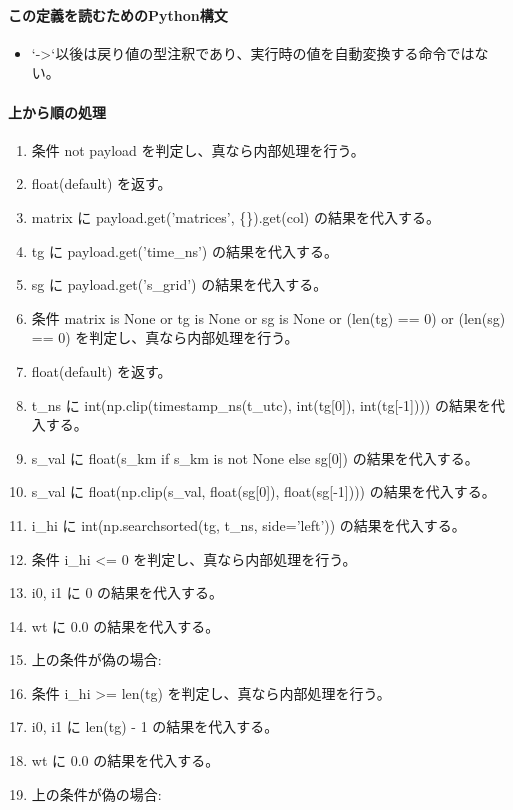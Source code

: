 \documentclass[a4paper,11pt]{article}
\begin{document}
            \paragraph{この定義を読むためのPython構文}
            \begin{itemize}[leftmargin=1.6em]
            \item `->`以後は戻り値の型注釈であり、実行時の値を自動変換する命令ではない。
            \end{itemize}
            \paragraph{上から順の処理}
            \begin{enumerate}[leftmargin=1.8em]
            \item 条件 not payload を判定し、真なら内部処理を行う。
\item   float(default) を返す。
\item matrix に payload.get('matrices', \{\}).get(col) の結果を代入する。
\item tg に payload.get('time\_ns') の結果を代入する。
\item sg に payload.get('s\_grid') の結果を代入する。
\item 条件 matrix is None or tg is None or sg is None or (len(tg) == 0) or (len(sg) == 0) を判定し、真なら内部処理を行う。
\item   float(default) を返す。
\item t\_ns に int(np.clip(timestamp\_ns(t\_utc), int(tg[0]), int(tg[-1]))) の結果を代入する。
\item s\_val に float(s\_km if s\_km is not None else sg[0]) の結果を代入する。
\item s\_val に float(np.clip(s\_val, float(sg[0]), float(sg[-1]))) の結果を代入する。
\item i\_hi に int(np.searchsorted(tg, t\_ns, side='left')) の結果を代入する。
\item 条件 i\_hi <= 0 を判定し、真なら内部処理を行う。
\item   i0, i1 に 0 の結果を代入する。
\item   wt に 0.0 の結果を代入する。
\item   上の条件が偽の場合:
\item   条件 i\_hi >= len(tg) を判定し、真なら内部処理を行う。
\item     i0, i1 に len(tg) - 1 の結果を代入する。
\item     wt に 0.0 の結果を代入する。
\item     上の条件が偽の場合:

\end{enumerate}
\end{document}
